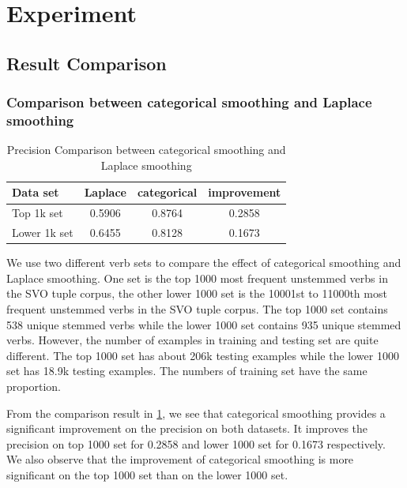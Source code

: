\section{Experiment}

\subsection{Result Comparison}

\subsubsection{Comparison between categorical smoothing and Laplace smoothing}

\begin{table}[t]
\caption{Precision Comparison between categorical smoothing and Laplace smoothing}
\label{tab-smoothing-comparison}
\vskip 0.15in
\begin{center}
\begin{small}
\begin{sc}
\begin{tabular}{l|cc|c}
\hline
\abovespace\belowspace
Data set & Laplace & categorical & improvement \\
\hline
\abovespace
Top 1k set & 0.5906 & 0.8764 & 0.2858 \\
\belowspace
Lower 1k set & 0.6455 & 0.8128 & 0.1673 \\
\hline
\end{tabular}
\end{sc}
\end{small}
\end{center}
\vskip -0.1in
\end{table}

We use two different verb sets to compare the effect of categorical smoothing and Laplace smoothing. One set is the top 1000 most frequent unstemmed verbs in the SVO tuple corpus, the other lower 1000 set is the 10001st to 11000th most frequent unstemmed verbs in the SVO tuple corpus. The top 1000 set contains 538 unique stemmed verbs while the lower 1000 set contains 935 unique stemmed verbs. However, the number of examples in training and testing set are quite different. The top 1000 set has about 206k testing examples while the lower 1000 set has 18.9k testing examples. The numbers of training set have the same proportion.

From the comparison result in \ref{tab-smoothing-comparison}, we see that categorical smoothing provides a significant improvement on the precision on both datasets. It improves the precision on top 1000 set for 0.2858 and lower 1000 set for 0.1673 respectively. We also observe that the improvement of categorical smoothing is more significant on the top 1000 set than on the lower 1000 set.

